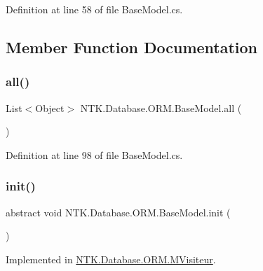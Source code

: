 Definition at line 58 of file Base\+Model.\+cs.



\subsection{Member Function Documentation}
\mbox{\label{class_n_t_k_1_1_database_1_1_o_r_m_1_1_base_model_ad3ca5afeb20a25305948eac6035d91fa}} 
\subsubsection{\texorpdfstring{all()}{all()}}
{\footnotesize\ttfamily List$<$Object$>$ N\+T\+K.\+Database.\+O\+R\+M.\+Base\+Model.\+all (\begin{DoxyParamCaption}{ }\end{DoxyParamCaption})}



Definition at line 98 of file Base\+Model.\+cs.

\mbox{\label{class_n_t_k_1_1_database_1_1_o_r_m_1_1_base_model_a62c00da7e4c99a778e04b0af16dc3938}} 
\subsubsection{\texorpdfstring{init()}{init()}}
{\footnotesize\ttfamily abstract void N\+T\+K.\+Database.\+O\+R\+M.\+Base\+Model.\+init (\begin{DoxyParamCaption}{ }\end{DoxyParamCaption})\hspace{0.3cm}{\ttfamily [pure virtual]}}







Implemented in \mbox{\hyperlink{class_n_t_k_1_1_database_1_1_o_r_m_1_1_m_visiteur_a6dd427b0024d9765aa329b010d0b7ecd}{N\+T\+K.\+Database.\+O\+R\+M.\+M\+Visiteur}}.

\mbox{\label{class_n_t_k_1_1_database_1_1_o_r_m_1_1_base_model_af9bc8b16291df7fa9120b1f21206c148}} 
